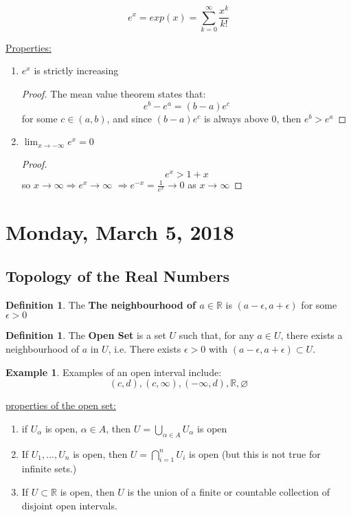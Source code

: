 \documentclass[12pt]{article}
\theoremstyle{plain}
\theoremstyle{definition}
\newtheorem{definition}[theorem]{Definition}
\newtheorem{example}[theorem]{Example}
\begin{document}
$$e^x = exp(x) = \sum^\infty_{k=0} \frac{x^k}{k!}$$

\underline{Properties:}
\begin{enumerate}
	\item{
	$e^x$ is strictly increasing
	\begin{proof}
		The mean value theorem states that:
		$$e^b - e^a = (b-a) e^c$$
		for some $c\in (a,b)$, and since $ (b-a) e^c$ is always above 0, then $e^b > e^a$
	\end{proof}

	}
	\item{$\lim_{x\to-\infty} e^x = 0$
	\begin{proof}
		$$e^x > 1+x$$
		so $x\to\infty \Longrightarrow e^x\to\infty$
		$\Longrightarrow e^{-x} = \frac{1}{e^x} \to 0$ as $x\to\infty$
	\end{proof}

	}
\end{enumerate}

\newpage

\section{Monday, March 5, 2018}

\subsection{Topology of the Real Numbers}

\begin{definition}
	The \textbf{The neighbourhood of $a\in\mathbb{R}$} is $(a-\epsilon, a+\epsilon)$ for some $\epsilon > 0$
\end{definition}

\begin{definition}
	The \textbf{Open Set} is a set $U$ such that, for any $a\in U$, there exists a neighbourhood of $a$ in $U$, i.e. There exists $\epsilon > 0$ with $(a-\epsilon, a+\epsilon) \subset U$.
\end{definition}

\begin{example}
	Examples of an open interval include:
	$$(c,d), (c,\infty), (-\infty, d), \mathbb{R}, \varnothing$$
\end{example}

\underline{properties of the open set:}
\begin{enumerate}
	\item{if $U_\alpha$ is open, $\alpha \in A$, then $U = \bigcup_{\alpha \in A} U_\alpha$ is open}
	\item{If $U_1, ..., U_n$ is open, then $U = \bigcap_{i=1}^n U_i$ is open (but this is not true for infinite sets.)}
	\item{If $U \subset \mathbb{R}$ is open, then $U$ is the union of a finite or countable collection of disjoint open intervals.}
\end{enumerate}
\end{document}
